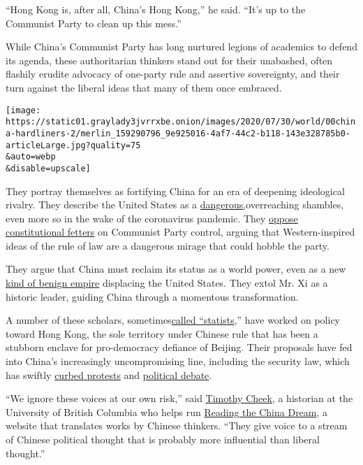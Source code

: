 ``Hong Kong is, after all, China's Hong Kong,'' he said. ``It's up to
the Communist Party to clean up this mess.''

While China's Communist Party has long nurtured legions of academics to
defend its agenda, these authoritarian thinkers stand out for their
unabashed, often flashily erudite advocacy of one-party rule and
assertive sovereignty, and their turn against the liberal ideas that
many of them once embraced.

\texttt{[image: https://static01.graylady3jvrrxbe.onion/images/2020/07/30/world/00china-hardliners-2/merlin\_159290796\_9e925016-4af7-44c2-b118-143e328785b0-articleLarge.jpg?quality=75\\\&auto=webp\\\&disable=upscale]}

They portray themselves as fortifying China for an era of deepening
ideological rivalry. They describe the United States as a
\href{http://www.publiclaw.cn/?c=news\&m=view\&id=7852}{dangerous,}overreaching
shambles, even more so in the wake of the coronavirus pandemic. They
\href{http://history.sina.com.cn/his/zl/2015-08-04/1454123837.shtml}{oppose
constitutional fetters} on Communist Party control, arguing that
Western-inspired ideas of the rule of law are a dangerous mirage that
could hobble the party.

They argue that China must reclaim its status as a world power, even as
a new
\href{https://www.readingthechinadream.com/jiang-shigong-empire-and-world-order.html}{kind
of benign empire} displacing the United States. They extol Mr. Xi as a
historic leader, guiding China through a momentous transformation.

A number of these scholars,
sometimes\href{https://www.researchgate.net/publication/326028916_The_Specter_of_Leviathan_A_Critique_of_Chinese_Statism_since_2000}{called
``statists},'' have worked on policy toward Hong Kong, the sole
territory under Chinese rule that has been a stubborn enclave for
pro-democracy defiance of Beijing. Their proposals have fed into China's
increasingly uncompromising line, including the security law, which has
swiftly
\href{https://www.nytimes3xbfgragh.onion/2020/07/01/world/asia/hong-kong-security-law-china.html}{curbed
protests} and
\href{https://www.nytimes3xbfgragh.onion/2020/07/08/world/asia/hong-kong-security-china-media.html}{political
debate}.

``We ignore these voices at our own risk,'' said
\href{https://history.ubc.ca/profile/timothy-cheek/}{Timothy Cheek}, a
historian at the University of British Columbia who helps run
\href{https://www.readingthechinadream.com/}{Reading the China Dream}, a
website that translates works by Chinese thinkers. ``They give voice to
a stream of Chinese political thought that is probably more influential
than liberal thought.''


